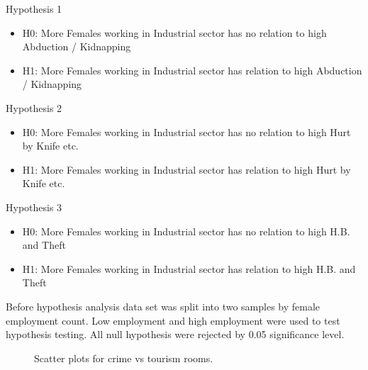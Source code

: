 \documentclass[conference]{IEEEtran}
\begin{document}
Hypothesis 1
\begin{itemize}
    \item H0: More Females working in Industrial sector has no relation to high Abduction / Kidnapping
    \item H1: More Females working in Industrial sector has relation to high Abduction / Kidnapping
\end{itemize}
Hypothesis 2
\begin{itemize}
    \item H0: More Females working in Industrial sector has no relation to high Hurt by Knife etc.
    \item H1: More Females working in Industrial sector has relation to high Hurt by Knife etc.
\end{itemize}
Hypothesis 3
\begin{itemize}
    \item H0: More Females working in Industrial sector has no relation to high H.B. and Theft
    \item H1: More Females working in Industrial sector has relation to high H.B. and Theft
\end{itemize}
Before hypothesis analysis data set was split into two samples by female employment count. Low employment and high employment were used to test hypothesis testing. All null hypothesis were rejected by 0.05 significance level.

\begin{figure}[htbp]
  \centering
    \qquad
    \caption{Scatter plots for crime vs tourism rooms.}
  \label{scatter}
\end{figure}
\end{document}
